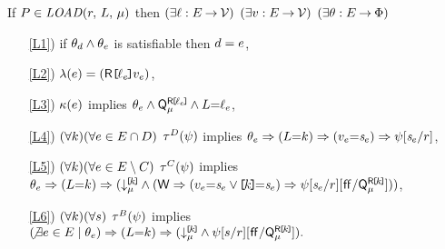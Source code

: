 \noindent
If $\aPS \in \sLOAD[\amode]{\aReg}{\cExp}$ then
$(\exists\ell:E\mathbin\rightarrow\mathcal{V})$
$(\exists v:E\mathbin\rightarrow\mathcal{V})$
$(\exists\theta:E\mathbin\rightarrow\Phi)$
\begin{enumerate}
\item[\ref{L1})] if $\theta_d\land\theta_e$ is satisfiable then $d=e$,
\item[\ref{L2})] $\labelingAct(\aEv) = \DRREFP{\cVal_\aEv}{\aVal_\aEv}$,
\item[\ref{L3})] $\kappa(e)$ implies
  \begin{math}
    \theta_e
    \land \mathsf{Q}_{\mu}^{\mathsf{R}\mkern-2mu\texttt{[}\mkern-2mu\ell_e \mkern-2mu\texttt{]}\mkern-2mu}
    \land L{=}\ell_e
  \end{math},
\item[\ref{L4})]
  \begin{math}
    (\forall k)
    (\forall e\in E\cap D)
  \end{math}
  $\aTr{\bEvs}{\bForm}$ implies
  \begin{math}
    \cForm_\aEv
    \limplies (\cExp{=}\dVal)
    \limplies (\aVal_\aEv{=}\uReg{\aEv})
    \limplies \bForm[\uReg{\aEv}/\aReg]%
  \end{math},
  \makebox[5.75cm]{}
\item[\ref{L5})] 
  \begin{math}
    (\forall k)
    (\forall e\in E\setminus C)
  \end{math}
  $\aTr{\cEvs}{\bForm}$ implies
  \begin{math}
    \cForm_\aEv
    \limplies (\cExp{=}\dVal)
    \limplies \PBR{        
      \DL{\REF{\dVal}}{\amode} \land
      (\RW
      \limplies (\aVal_\aEv{=}\uReg{\aEv}\lor\REF{\dVal}{=}\uReg{\aEv}) 
      \limplies
      \bForm
      [\uReg{\aEv}/\aReg]%
      [\FALSE/\QL{\REF{\dVal}}{\amode}]
      )
    }      
  \end{math},
\item[\ref{L6})] %
  \begin{math}
    (\forall k)
    (\forall s)
  \end{math}
  $\aTr{\dEvs}{\bForm}$  implies 
  \begin{math}
    (\!\not\exists\aEv\in\aEvs \suchthat \cForm_\aEv)
    \limplies (\cExp{=}\dVal)
    \limplies \PBR{        
      \DL{\REF{\dVal}}{\amode} \land
      \bForm
      [\bReg/\aReg]%
      [\FALSE/\QL{\REF{\dVal}}{\amode}]
    }.
  \end{math}
\end{enumerate}  
